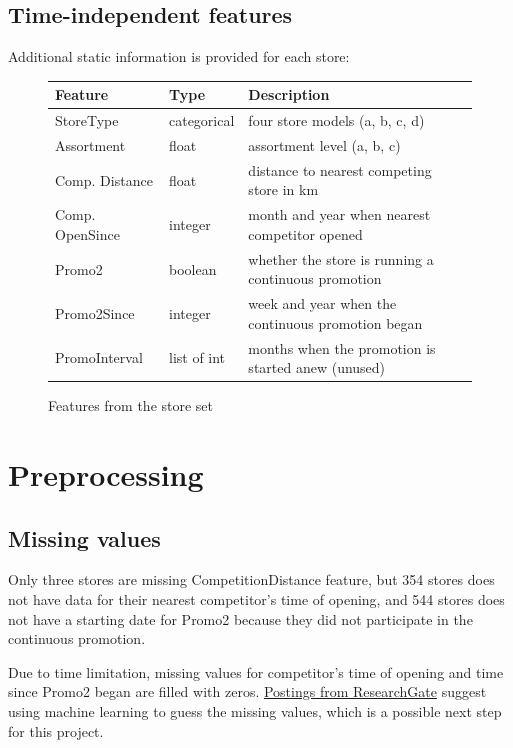 \documentclass[DIV=calc, paper=a4, fontsize=11pt, twocolumn]{scrartcl}
\begin{document}
	\subsection{Time-independent features}
	Additional static information is provided for each store:

    \begin{figure}[H]
        \centering
	    \begin{tabular}{llp{2.7cm}}
	    \toprule
	    Feature & Type & Description\\
	    \toprule
	    StoreType		& categorical 	& four store models (a, b, c, d) \\
	    Assortment		& float 	 	& assortment level (a, b, c) \\
	    Comp. Distance
	     				& float 		& distance to nearest competing store in km \\
	    Comp. OpenSince
	     				& integer 		& month and year when nearest competitor opened \\
	    Promo2			& boolean		& whether the store is running a continuous promotion \\
	    Promo2Since 	& integer 		& week and year when the continuous promotion began \\
	    PromoInterval	& list of int & months when the promotion is started anew (unused) \\
	    \bottomrule
	    \end{tabular}
        \caption{Features from the store set}
	    \end{figure}

\section{Preprocessing}
\subsection{Missing values}
Only three stores are missing CompetitionDistance feature, but 354 stores does not have data for their nearest competitor's time of opening, and 544 stores does not have a starting date for Promo2 because they did not participate in the continuous promotion.

Due to time limitation, missing values for competitor's time of opening and time since Promo2 began are filled with zeros. \href{https://www.researchgate.net/post/Is_it_possible_to_train_a_neural_network_with_missing_data2}{Postings from ResearchGate} suggest using machine learning to guess the missing values, which is a possible next step for this project.
\end{document}
